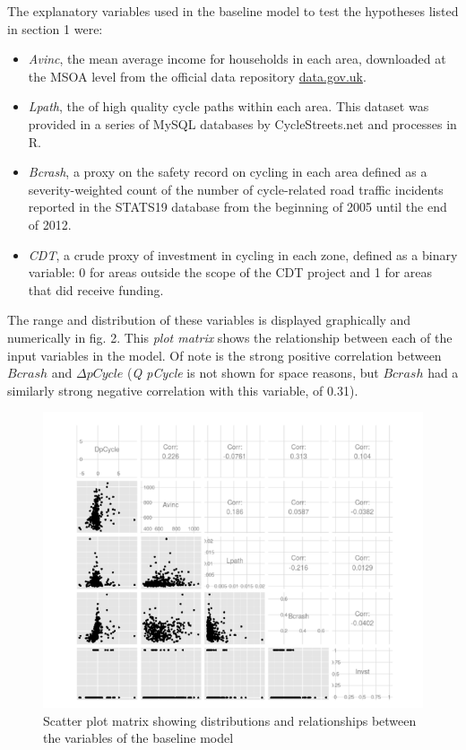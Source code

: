 The explanatory variables used in the baseline model to test the
hypotheses listed in section 1 were:

\begin{itemize}
\item
  \emph{Avinc}, the mean average income for households in each area,
  downloaded at the MSOA level from the official data repository
  \href{http://data.gov.uk/dataset/household_earnings_estimates_-_model-based_estimates_of_income_for_msoas}{data.gov.uk}.
\item
  \emph{Lpath}, the of high quality cycle paths within each area. This
  dataset was provided in a series of MySQL databases by
  CycleStreets.net and processes in R.
\item
  \emph{Bcrash}, a proxy on the safety record on cycling in each area
  defined as a severity-weighted count of the number of cycle-related
  road traffic incidents reported in the STATS19 database from the
  beginning of 2005 until the end of 2012.
\item
  \emph{CDT}, a crude proxy of investment in cycling in each zone,
  defined as a binary variable: 0 for areas outside the scope of the CDT
  project and 1 for areas that did receive funding.
\end{itemize}

The range and distribution of these variables is displayed graphically
and numerically in fig. 2. This \emph{plot matrix} shows the
relationship between each of the input variables in the model. Of note
is the strong positive correlation between $Bcrash$ and $\Delta pCycle$
(\emph{Q pCycle} is not shown for space reasons, but $Bcrash$ had a
similarly strong negative correlation with this variable, of 0.31).

\begin{figure}[htbp]
\centering
\includegraphics{figure/unnamed-chunk-5.png}
\caption{Scatter plot matrix showing distributions and relationships
between the variables of the baseline model}
\end{figure}

